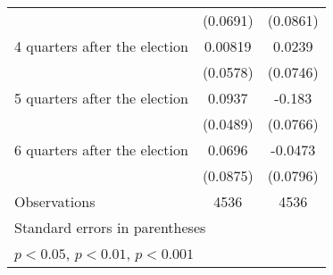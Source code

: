 \begin{table}[htbp]
\begin{tabular}{l*{2}{c}}
                    &    (0.0691)         &    (0.0861)         \\
[1em]
 4 quarters after the election&     0.00819         &      0.0239         \\
                    &    (0.0578)         &    (0.0746)         \\
[1em]
 5 quarters after the election&      0.0937         &      -0.183\sym{*}  \\
                    &    (0.0489)         &    (0.0766)         \\
[1em]
 6 quarters after the election&      0.0696         &     -0.0473         \\
                    &    (0.0875)         &    (0.0796)         \\
\hline
Observations        &        4536         &        4536         \\
\hline\hline
\multicolumn{3}{l}{\footnotesize Standard errors in parentheses}\\
\multicolumn{3}{l}{\footnotesize \sym{*} \(p<0.05\), \sym{**} \(p<0.01\), \sym{***} \(p<0.001\)}\\
\end{tabular}
\end{table}
